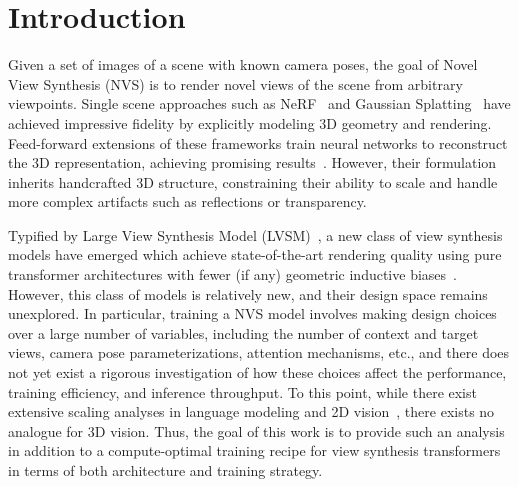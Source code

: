 \section{Introduction}
\label{sec:intro}

%
Given a set of images of a scene with known camera poses, the goal of Novel View Synthesis (NVS) is to render novel views of the scene from arbitrary viewpoints. Single scene approaches such as NeRF~\citep{mildenhall2021nerf} and Gaussian Splatting~\citep{kerbl20233d} have achieved impressive fidelity by explicitly modeling 3D geometry and rendering. 
%
Feed-forward extensions of these frameworks train neural networks to reconstruct the 3D representation, achieving promising results~\citep{yu2020pixelnerf,charatan2024pixelsplat,chen2024mvsplat,zhang2024gs}.  However, their formulation inherits handcrafted 3D structure, constraining their ability to scale and handle more complex artifacts such as reflections or transparency.


Typified by Large View Synthesis Model (LVSM)~\cite{jin2024lvsm}, a new class of view synthesis models have emerged which achieve state-of-the-art rendering quality using pure transformer architectures with fewer (if any) geometric inductive biases~\cite{jin2024lvsm, jiang2025rayzer, mitchel2025true, sajjadi2022scene}. However, this class of models is relatively new, and their design space remains unexplored. In particular, training a NVS model involves making design choices over a large number of variables, including the number of context and target views, camera pose parameterizations, attention mechanisms, etc., and there does not yet exist a rigorous investigation of how these choices affect the performance, training efficiency, and inference throughput. To this point, while there exist extensive scaling analyses in language modeling and 2D vision~\cite{esser2024scaling, hoffmann2022training, kaplan2020scaling, peebles2023scalable, zhai2022scaling}, there exists no analogue for 3D vision. Thus, the goal of this work is to provide such an analysis in addition to a compute-optimal training recipe for view synthesis transformers in terms of both architecture and training strategy.


